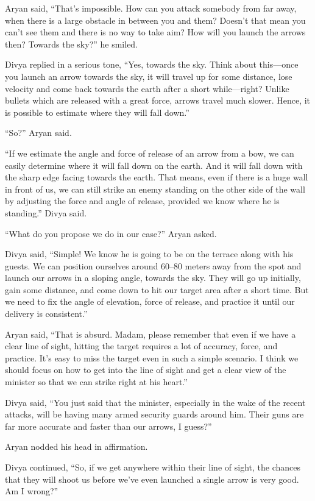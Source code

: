 Aryan said, “That's impossible. How can you attack somebody from far away, when
there is a large obstacle in between you and them? Doesn't that mean you can't
see them and there is no way to take aim? How will you launch the arrows then?
Towards the sky?” he smiled.

Divya replied in a serious tone, “Yes, towards the sky. Think about this—once
you launch an arrow towards the sky, it will travel up for some distance, lose
velocity and come back towards the earth after a short while—right? Unlike
bullets which are released with a great force, arrows travel much slower. Hence,
it is possible to estimate where they will fall down.”

“So?” Aryan said.

“If we estimate the angle and force of release of an arrow from a bow, we can
easily determine where it will fall down on the earth. And it will fall down
with the sharp edge facing towards the earth. That means, even if there is a
huge wall in front of us, we can still strike an enemy standing on the other
side of the wall by adjusting the force and angle of release, provided we know
where he is standing.” Divya said.

“What do you propose we do in our case?” Aryan asked.

Divya said, “Simple! We know he is going to be on the terrace along with his
guests. We can position ourselves around 60–80 meters away from the spot and
launch our arrows in a sloping angle, towards the sky. They will go up
initially, gain some distance, and come down to hit our target area after a
short time. But we need to fix the angle of elevation, force of release, and
practice it until our delivery is consistent.”

Aryan said, “That is absurd. Madam, please remember that even if we have a clear
line of sight, hitting the target requires a lot of accuracy, force, and
practice. It's easy to miss the target even in such a simple scenario. I think
we should focus on how to get into the line of sight and get a clear view of the
minister so that we can strike right at his heart.”

Divya said, “You just said that the minister, especially in the wake of the
recent attacks, will be having many armed security guards around him. Their guns
are far more accurate and faster than our arrows, I guess?”

Aryan nodded his head in affirmation.

Divya continued, “So, if we get anywhere within their line of sight, the chances
that they will shoot us before we've even launched a single arrow is very good.
Am I wrong?”

